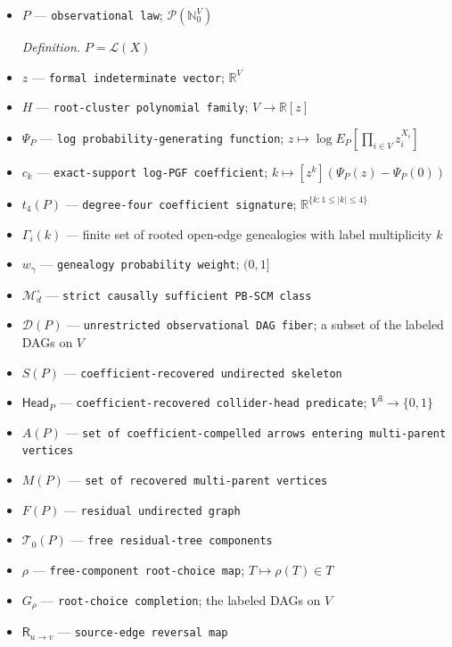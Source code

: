 \documentclass{article}
\begin{document}
\begin{itemize}
  \item \(P\) --- \texttt{observational law}; \(\mathcal P(\mathbb N_0^V)\)
  \par\smallskip\noindent\emph{Definition.} \(P=\mathcal L(X)\)
  \item \(z\) --- \texttt{formal indeterminate vector}; \(\mathbb R^V\)
  \item \(H\) --- \texttt{root-\allowbreak{}cluster polynomial family}; \(V\to\mathbb R[z]\)
  \item \(\Psi_P\) --- \texttt{log probability-\allowbreak{}generating function}; \(z\mapsto\log E_P[\prod_{i\in V}z_i^{X_i}]\)
  \item \(c_k\) --- \texttt{exact-\allowbreak{}support log-\allowbreak{}PGF coefficient}; \(k\mapsto[z^k](\Psi_P(z)-\Psi_P(0))\)
  \item \(t_4(P)\) --- \texttt{degree-\allowbreak{}four coefficient signature}; \(\mathbb R^{\{k:1\le |k|\le4\}}\)
  \item \(\Gamma_i(k)\) --- finite set of rooted open-edge genealogies with label multiplicity \(k\)
  \item \(w_\gamma\) --- \texttt{genealogy probability weight}; \((0,1]\)
  \item \(\mathcal M_d^\circ\) --- \texttt{strict causally sufficient PB-\allowbreak{}SCM class}
  \item \(\mathcal D(P)\) --- \texttt{unrestricted observational DAG fiber}; a subset of the labeled DAGs on \(V\)
  \item \(S(P)\) --- \texttt{coefficient-\allowbreak{}recovered undirected skeleton}
  \item \(\mathsf{Head}_P\) --- \texttt{coefficient-\allowbreak{}recovered collider-\allowbreak{}head predicate}; \(V^3\to\{0,1\}\)
  \item \(A(P)\) --- \texttt{set of coefficient-\allowbreak{}compelled arrows entering multi-\allowbreak{}parent vertices}
  \item \(M(P)\) --- \texttt{set of recovered multi-\allowbreak{}parent vertices}
  \item \(F(P)\) --- \texttt{residual undirected graph}
  \item \(\mathcal T_0(P)\) --- \texttt{free residual-\allowbreak{}tree components}
  \item \(\rho\) --- \texttt{free-\allowbreak{}component root-\allowbreak{}choice map}; \(T\mapsto\rho(T)\in T\)
  \item \(G_\rho\) --- \texttt{root-\allowbreak{}choice completion}; the labeled DAGs on \(V\)
  \item \(\mathsf R_{u\to v}\) --- \texttt{source-\allowbreak{}edge reversal map}

\end{itemize}
\end{document}
